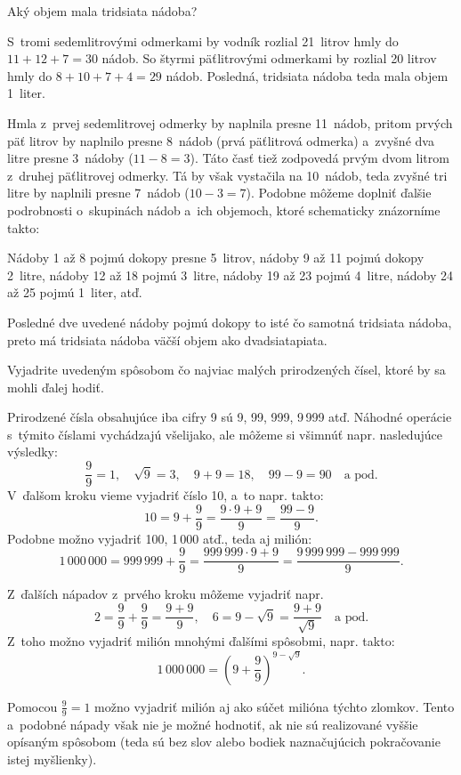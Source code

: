 {%
\napad
Aký objem mala tridsiata nádoba?

\riesenie
S~tromi sedemlitrovými odmerkami by vodník rozlial 21~litrov hmly do $11+12+7=30$ nádob.
So štyrmi päťlitrovými odmerkami by rozlial 20 litrov hmly do $8+10+7+4=29$ nádob.
Posledná, tridsiata nádoba teda mala objem 1~liter.

Hmla z~prvej sedemlitrovej odmerky by naplnila presne 11~nádob, pritom prvých päť litrov by naplnilo presne 8~nádob (prvá päťlitrová odmerka) a~zvyšné dva litre presne 3~nádoby ($11-8=3$).
Táto časť tiež zodpovedá prvým dvom litrom z~druhej päťlitrovej odmerky.
Tá by však vystačila na 10~nádob, teda zvyšné tri litre by naplnili presne 7~nádob ($10-3=7$).
Podobne môžeme doplniť ďalšie podrobnosti o~skupinách nádob a~ich objemoch, ktoré schematicky znázorníme takto:
%


Nádoby 1 až 8 pojmú dokopy presne 5~litrov,
nádoby 9 až 11 pojmú dokopy 2~litre,
nádoby 12 až 18 pojmú 3~litre,
nádoby 19 až 23 pojmú 4~litre,
nádoby 24 až 25 pojmú 1~liter, atď.

Posledné dve uvedené nádoby pojmú dokopy to isté čo samotná tridsiata nádoba,
preto má tridsiata nádoba väčší objem ako dvadsiatapiata.
}

{%
\napad
Vyjadrite uvedeným spôsobom čo najviac malých prirodzených čísel, ktoré by sa mohli ďalej hodiť.

\riesenie
Prirodzené čísla obsahujúce iba cifry 9 sú 9, 99, 999, 9\,999 atď.
Náhodné operácie s~týmito číslami vychádzajú všelijako, ale môžeme si všimnúť napr. nasledujúce výsledky:
$$
\frac99=1,\quad
\sqrt9=3,\quad
9+9=18,\quad
99-9=90\quad
\text{a pod.}
$$
V~ďalšom kroku vieme vyjadriť číslo 10, a~to napr. takto:
$$
10=9+\frac99=\frac{9\cdot9+9}9=\frac{99-9}9.
$$
Podobne možno vyjadriť 100, 1\,000 atď., teda aj milión:
$$
1\,000\,000
=999\,999+\frac99
=\frac{999\,999\cdot9+9}9
=\frac{9\,999\,999-999\,999}9.
$$

Z~ďalších nápadov z~prvého kroku môžeme vyjadriť napr.
$$
2=\frac99+\frac99=\frac{9+9}9,\quad
6=9-\sqrt9=\frac{9+9}{\sqrt9}\quad
\text{a pod.}
$$
Z~toho možno vyjadriť milión mnohými ďalšími spôsobmi, napr. takto:
$$
1\,000\,000=\left( 9+\frac99 \right)^{9-\sqrt9}.
$$

\poznamka
Pomocou $\frac99=1$ možno vyjadriť milión aj ako súčet milióna týchto zlomkov.
Tento a~podobné nápady však nie je možné hodnotiť, ak nie sú realizované vyššie opísaným spôsobom (teda sú bez slov alebo bodiek naznačujúcich pokračovanie istej myšlienky).
}

